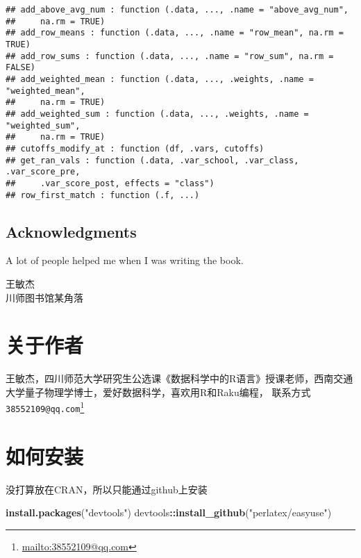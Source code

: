 \documentclass[
]{krantz}
\makeatletter
\newenvironment{Shaded}{\begin{snugshade}}{\end{snugshade}}
\newcommand{\KeywordTok}[1]{\textcolor[rgb]{0.27,0.27,0.27}{\textbf{#1}}}
\newcommand{\NormalTok}[1]{#1}
\newcommand{\OperatorTok}[1]{\textcolor[rgb]{0.43,0.43,0.43}{\textbf{#1}}}
\newcommand{\StringTok}[1]{\textcolor[rgb]{0.5,0.5,0.5}{#1}}
\renewcommand{\href}[2]{#2\footnote{\url{#1}}}
\newenvironment{kframe}{%
\medskip{}
\setlength{\fboxsep}{.8em}
 \def\at@end@of@kframe{}%
 \ifinner\ifhmode%
  \def\at@end@of@kframe{\end{minipage}}%
  \begin{minipage}{\columnwidth}%
 \fi\fi%
 \def\FrameCommand##1{\hskip\@totalleftmargin \hskip-\fboxsep
 \colorbox{shadecolor}{##1}\hskip-\fboxsep
     \hskip-\linewidth \hskip-\@totalleftmargin \hskip\columnwidth}%
 \MakeFramed {\advance\hsize-\width
   \@totalleftmargin\z@ \linewidth\hsize
   \@setminipage}}%
 {\par\unskip\endMakeFramed%
 \at@end@of@kframe}
\renewenvironment{Shaded}{\begin{kframe}}{\end{kframe}}
\let\BeginKnitrBlock\begin \let\EndKnitrBlock\end
\makeatother
\begin{document}
\begin{verbatim}
## add_above_avg_num : function (.data, ..., .name = "above_avg_num", 
##     na.rm = TRUE)  
## add_row_means : function (.data, ..., .name = "row_mean", na.rm = TRUE)  
## add_row_sums : function (.data, ..., .name = "row_sum", na.rm = FALSE)  
## add_weighted_mean : function (.data, ..., .weights, .name = "weighted_mean", 
##     na.rm = TRUE)  
## add_weighted_sum : function (.data, ..., .weights, .name = "weighted_sum", 
##     na.rm = TRUE)  
## cutoffs_modify_at : function (df, .vars, cutoffs)  
## get_ran_vals : function (.data, .var_school, .var_class, .var_score_pre, 
##     .var_score_post, effects = "class")  
## row_first_match : function (.f, ...)
\end{verbatim}

\hypertarget{acknowledgments}{%
\section*{Acknowledgments}\label{acknowledgments}}


A lot of people helped me when I was writing the book.

\BeginKnitrBlock{flushright}
王敏杰\\
川师图书馆某角落
\EndKnitrBlock{flushright}

\hypertarget{ux5173ux4e8eux4f5cux8005}{%
\chapter*{关于作者}\label{ux5173ux4e8eux4f5cux8005}}


王敏杰，四川师范大学研究生公选课《数据科学中的R语言》授课老师，西南交通大学量子物理学博士，爱好数据科学，喜欢用R和Raku编程， 联系方式 \href{mailto:38552109@qq.com}{\nolinkurl{38552109@qq.com}}

\mainmatter

\hypertarget{install}{%
\chapter{如何安装}\label{install}}

没打算放在CRAN，所以只能通过github上安装

\begin{Shaded}
\begin{Highlighting}[]
\KeywordTok{install.packages}\NormalTok{(}\StringTok{"devtools"}\NormalTok{)}
\NormalTok{devtools}\OperatorTok{::}\KeywordTok{install_github}\NormalTok{(}\StringTok{"perlatex/easyuse"}\NormalTok{)}
\end{Highlighting}
\end{Shaded}
\end{document}
